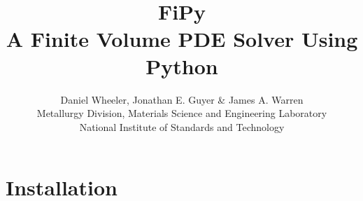 \documentclass{book}
\newcommand{\logo}{\rotatebox{4}{\textcolor{red}{\( \varphi \)}}\kern-.74em\raisebox{-.15em}{\textcolor{blue}{\( \pi\)}}}
\newcommand{\logoToo}{\raisebox{-.15em}{\textcolor{blue}{\(\pi\)}}\kern-.64em\rotatebox{4}{\textcolor{red}{\( \varphi \)}}}
\begin{document}
\frontmatter





\setlength{\fboxrule}{2\fboxrule}
\newlength{\BCL} %

\renewcommand{\sectionmark}[1]{\markboth{#1}{}}
\renewcommand{\subsectionmark}[1]{\markright{#1}}

\newenvironment{Ventry}[1]%
  {\begin{list}{}{%
    \renewcommand{\makelabel}[1]{\texttt{##1:}\hfil}%
    \settowidth{\labelwidth}{\texttt{#1:}}%
    \setlength{\leftmargin}{\labelsep}%
    \addtolength{\leftmargin}{\labelwidth}}}%
  {\end{list}}

\title{
\scalebox{5}{\logo} \\[2ex]
\scalebox{5}{\logoToo} \\[2ex]
FiPy\\
{\large A Finite Volume PDE Solver Using Python} \\
}

\author{Daniel Wheeler, Jonathan E. Guyer \& James A. Warren \\[2ex]
Metallurgy Division, Materials Science and Engineering Laboratory\\
National Institute of Standards and Technology}

\maketitle

\tableofcontents

\mainmatter

\chapter{Installation}
\end{document}
